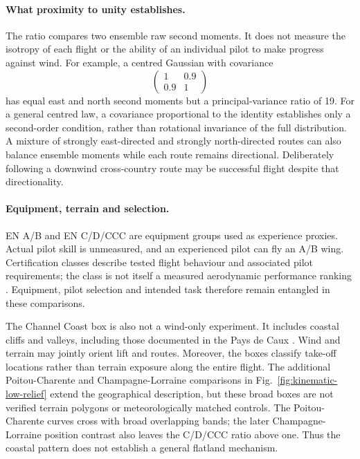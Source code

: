 \paragraph{What proximity to unity establishes.}
The ratio compares two ensemble raw second moments. It does not measure the
isotropy of each flight or the ability of an individual pilot to make progress
against wind. For example, a centred Gaussian with covariance
\[
 \begin{pmatrix}1&0.9\\0.9&1\end{pmatrix}
\]
has equal east and north second moments but a principal-variance ratio of 19.
For a general centred law, a covariance proportional to the identity establishes
only a second-order condition, rather than rotational invariance of the full
distribution. A mixture
of strongly east-directed and strongly north-directed routes can also balance
ensemble moments while each route remains directional. Deliberately following a
downwind cross-country route may be successful flight despite that directionality.

\paragraph{Equipment, terrain and selection.}
EN A/B and EN C/D/CCC are equipment groups used as experience proxies. Actual pilot
skill is unmeasured, and an experienced pilot can fly an A/B wing. Certification
classes describe tested flight behaviour and associated pilot requirements; the
class is not itself a measured aerodynamic performance ranking
\cite{dhv_classification}. Equipment, pilot selection and intended task therefore
remain entangled in these comparisons.

The Channel Coast box is also not a wind-only experiment. It includes coastal
cliffs and valleys, including those documented in the Pays de Caux
\cite{dreal_pays_de_caux}. Wind and terrain may jointly orient lift and routes.
Moreover, the boxes classify take-off locations rather than terrain exposure along
the entire flight. The additional Poitou-Charente and Champagne-Lorraine comparisons
in Fig.~\ref{fig:kinematic-low-relief} extend the geographical description, but these
broad boxes are not verified terrain polygons or meteorologically matched controls.
The Poitou-Charente curves cross with broad overlapping bands; the later
Champagne-Lorraine position contrast also leaves the C/D/CCC ratio above one.
Thus the coastal pattern does not establish a general flatland mechanism.

